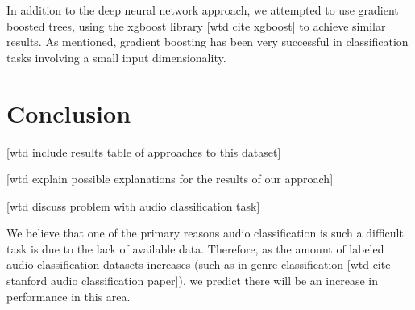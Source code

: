 \documentclass[a4paper,11pt,twoside]{scrbook}
\begin{document}
In addition to the deep neural network approach, we attempted to use gradient boosted trees, using the xgboost library [wtd cite xgboost] to achieve similar results.  As mentioned, gradient boosting has been very successful in classification tasks involving a small input dimensionality.

\chapter{Conclusion}

[wtd include results table of approaches to this dataset]

[wtd explain possible explanations for the results of our approach]

[wtd discuss problem with audio classification task]

We believe that one of the primary reasons audio classification is such a difficult task is due to the lack of available data.  Therefore, as the amount of labeled audio classification datasets increases (such as in genre classification [wtd cite stanford audio classification paper]), we predict there will be an increase in performance in this area.
\end{document}
